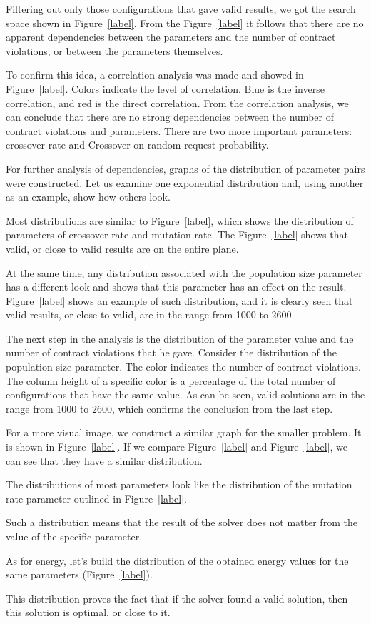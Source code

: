 Filtering out only those configurations that gave valid results, we got the search space shown in Figure~\ref{label}. From the Figure~\ref{label} it follows that there are no apparent dependencies between the parameters and the number of contract violations, or between the parameters themselves.

To confirm this idea, a correlation analysis was made and showed in Figure~\ref{label}. Colors indicate the level of correlation. Blue is the inverse correlation, and red is the direct correlation.
From the correlation analysis, we can conclude that there are no strong dependencies between the number of contract violations and parameters. There are two more important parameters: crossover rate and Crossover on random request probability.

For further analysis of dependencies, graphs of the distribution of parameter pairs were constructed. Let us examine one exponential distribution and, using another as an example, show how others look.

Most distributions are similar to Figure~\ref{label}, which shows the distribution of parameters of crossover rate and mutation rate. 
The Figure~\ref{label} shows that valid, or close to valid results are on the entire plane.

At the same time, any distribution associated with the population size parameter has a different look and shows that this parameter has an effect on the result.
Figure~\ref{label} shows an example of such distribution, and it is clearly seen that valid results, or close to valid, are in the range from 1000 to 2600.

The next step in the analysis is the distribution of the parameter value and the number of contract violations that he gave. Consider the distribution of the population size parameter.
The color indicates the number of contract violations. The column height of a specific color is a percentage of the total number of configurations that have the same value. As can be seen, valid solutions are in the range from 1000 to 2600, which confirms the conclusion from the last step.

For a more visual image, we construct a similar graph for the smaller problem. It is shown in Figure~\ref{label}. If we compare Figure~\ref{label} and Figure~\ref{label}, we can see that they have a similar distribution.

The distributions of most parameters look like the distribution of the mutation rate parameter outlined in Figure~\ref{label}.

Such a distribution means that the result of the solver does not matter from the value of the specific parameter.

As for energy, let's build the distribution of the obtained energy values for the same parameters (Figure~\ref{label}).

This distribution proves the fact that if the solver found a valid solution, then this solution is optimal, or close to it.